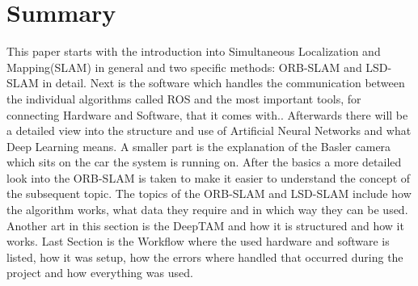 

\chapter*{Summary}

This paper starts with the introduction into Simultaneous Localization and Mapping(SLAM) in general and two specific methods: ORB-SLAM and LSD-SLAM in detail. \newline
Next is the software which handles the communication between the individual algorithms called ROS and the most important tools, for connecting Hardware and Software, that it comes with.. Afterwards there will be a detailed view into the structure and use of Artificial Neural Networks and what Deep Learning means. A smaller part is the explanation of the Basler camera which sits on the car the system is running on. \newline
After the basics a more detailed look into the ORB-SLAM is taken to make it easier to understand the concept of the subsequent topic. The topics of the ORB-SLAM and LSD-SLAM include how the algorithm works, what data they require and in which way they can be used. Another art in this section is the DeepTAM and how it is structured and how it works. \newline
Last Section is the Workflow where the used hardware and software is listed, how it was setup, how the errors where handled that occurred during the project and how everything was used.
